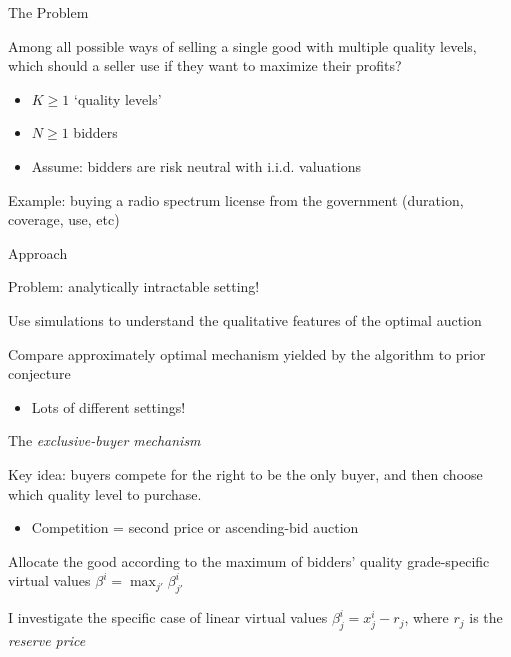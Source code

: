\documentclass[aspectratio=169,xcolor=dvipsnames]{beamer}
\begin{document}
\begin{frame}{The Problem}

Among all possible ways of selling a single good with multiple quality levels, which should a seller use if they want to maximize their profits?

\vspace{5mm}
\begin{itemize}
    \item $K\geq1$ `quality levels'
    \item $N\geq1$ bidders
    \item Assume: bidders are risk neutral with i.i.d. valuations
\end{itemize}

\vspace{5mm}
Example: buying a radio spectrum license from the government (duration, coverage, use, etc)

\end{frame}



\begin{frame}{Approach}

{\color{red}Problem: analytically intractable setting!}

\vspace{5mm}
Use simulations to understand the qualitative features of the optimal auction

\vspace{5mm}
Compare approximately optimal mechanism yielded by the algorithm to prior conjecture
\begin{itemize}
    \item Lots of different settings!
\end{itemize}

\end{frame}


\begin{frame}{The \textit{exclusive-buyer mechanism}}

Key idea: buyers compete for the right to be the only buyer, and then choose which quality level to purchase. 
\begin{itemize}
    \item Competition = second price or ascending-bid auction
\end{itemize}

\vspace{5mm}
Allocate the good according to the maximum of bidders' quality grade-specific virtual values $\beta^i = \max_{j'} \beta_{j'}^i$

\vspace{5mm}
I investigate the specific case of linear virtual values $\beta_j^i = x_j^i - r_j$, where $r_j$ is the \textit{reserve price}

\end{frame}
\end{document}

